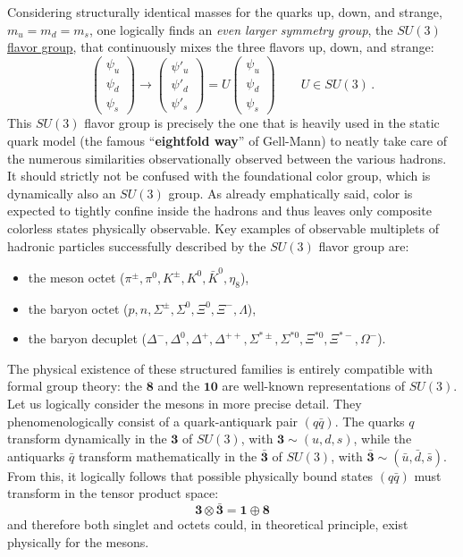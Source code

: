 Considering structurally identical masses for the quarks up, down, and strange, \(m_u = m_d = m_s\), one logically finds an \textit{even larger symmetry group}, the \uline{\(SU(3)\) flavor group}, that continuously mixes the three flavors up, down, and strange:
\begin{equation} \label{eq:flavor_su3}
    \begin{pmatrix} \psi_u \\ \psi_d \\ \psi_s \end{pmatrix} \rightarrow \begin{pmatrix} \psi'_u \\ \psi'_d \\ \psi'_s \end{pmatrix} = U \begin{pmatrix} \psi_u \\ \psi_d \\ \psi_s \end{pmatrix} \qquad U \in SU(3) \, .
\end{equation}
This \(SU(3)\) flavor group is precisely the one that is heavily used in the static quark model (the famous ``\textbf{eightfold way}'' of Gell-Mann) to neatly take care of the numerous similarities observationally observed between the various hadrons. It should strictly not be confused with the foundational color group, which is dynamically also an \(SU(3)\) group. As already emphatically said, color is expected to tightly confine inside the hadrons and thus leaves only composite colorless states physically observable. Key examples of observable multiplets of hadronic particles successfully described by the \(SU(3)\) flavor group are:
\begin{itemize}
    \item the meson octet (\(\pi^\pm, \pi^0, K^\pm, K^0, \bar{K}^0, \eta_8\)),
    \item the baryon octet (\(p, n, \Sigma^\pm, \Sigma^0, \Xi^0, \Xi^-, \Lambda\)),
    \item the baryon decuplet (\(\Delta^-, \Delta^0, \Delta^+, \Delta^{++}, \Sigma^{*\pm}, \Sigma^{*0}, \Xi^{*0}, \Xi^{*-}, \Omega^-\)).
\end{itemize}

The physical existence of these structured families is entirely compatible with formal group theory: the \(\mathbf{8}\) and the \(\mathbf{10}\) are well-known representations of \(SU(3)\). Let us logically consider the mesons in more precise detail. They phenomenologically consist of a quark-antiquark pair \((q\bar{q})\). The quarks \(q\) transform dynamically in the \(\mathbf{3}\) of \(SU(3)\), with \(\mathbf{3} \sim (u, d, s)\), while the antiquarks \(\bar{q}\) transform mathematically in the \(\bar{\mathbf{3}}\) of \(SU(3)\), with \(\bar{\mathbf{3}} \sim (\bar{u}, \bar{d}, \bar{s})\). From this, it logically follows that possible physically bound states \((q\bar{q})\) must transform in the tensor product space:
\[
    \mathbf{3} \otimes \bar{\mathbf{3}} = \mathbf{1} \oplus \mathbf{8}
\]
and therefore both singlet and octets could, in theoretical principle, exist physically for the mesons.

